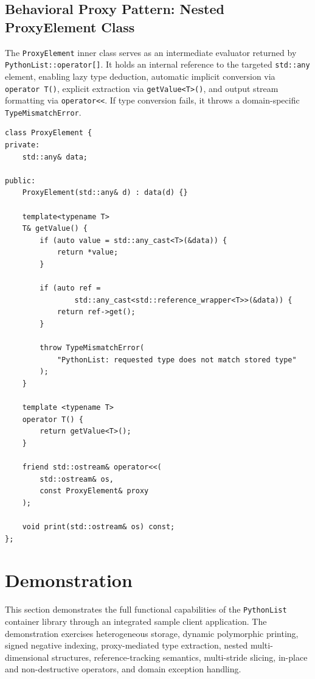 \documentclass[12pt,a4paper]{report}
\begin{document}
\subsection{Behavioral Proxy Pattern: Nested ProxyElement Class}
The \texttt{ProxyElement} inner class serves as an intermediate evaluator returned by \texttt{PythonList::}\allowbreak\texttt{operator[]}. It holds an internal reference to the targeted \texttt{std::any} element, enabling lazy type deduction, automatic implicit conversion via \texttt{operator T()}, explicit extraction via \texttt{getValue<T>()}, and output stream formatting via \texttt{operator<<}. If type conversion fails, it throws a domain-specific \texttt{TypeMismatchError}.

\begin{lstlisting}[style=cppsnippet]
class ProxyElement {
private:
    std::any& data;

public:
    ProxyElement(std::any& d) : data(d) {}

    template<typename T>
    T& getValue() {
        if (auto value = std::any_cast<T>(&data)) {
            return *value;
        }

        if (auto ref =
                std::any_cast<std::reference_wrapper<T>>(&data)) {
            return ref->get();
        }

        throw TypeMismatchError(
            "PythonList: requested type does not match stored type"
        );
    }

    template <typename T>
    operator T() {
        return getValue<T>();
    }

    friend std::ostream& operator<<(
        std::ostream& os,
        const ProxyElement& proxy
    );
    
    void print(std::ostream& os) const;
};
\end{lstlisting}

\newpage
\section{Demonstration}

This section demonstrates the full functional capabilities of the \texttt{PythonList} container library through an integrated sample client application. The demonstration exercises heterogeneous storage, dynamic polymorphic printing, signed negative indexing, proxy-mediated type extraction, nested multi-dimensional structures, reference-tracking semantics, multi-stride slicing, in-place and non-destructive operators, and domain exception handling.
\end{document}
